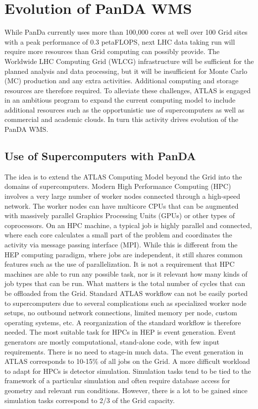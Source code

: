 \documentclass[10pt, conference, compsocconf]{IEEEtran}
\begin{document}
\section{Evolution of PanDA WMS}
While PanDa  currently uses  more than 100,000  cores at well over 100 Grid sites with a  peak performance  of 0.3 petaFLOPS,  next LHC data taking run will  require more resources  than Grid computing can possibly provide. The Worldwide LHC Computing Grid (WLCG) infrastructure will be sufficient for the planned analysis and data processing, but it will be insufficient  for Monte Carlo (MC) production and any extra activities. Additional computing and storage  resources are therefore required.  To alleviate  these challenges, ATLAS is engaged  in an ambitious  program to expand  the current computing model to include  additional  resources such as the opportunistic   use of supercomputers   as well as commercial and academic clouds. In turn this activity drives evolution of the PanDA WMS.

\subsection{Use of Supercomputers with PanDA}
The idea is to extend the ATLAS Computing Model beyond the Grid into the domains of supercomputers. Modern High Performance Computing  (HPC) involves  a very large number of worker nodes  connected  through a  high-speed   network. The worker nodes can have  multicore CPUs that can be augmented with massively parallel Graphics Processing Units (GPUs) or other types of coprocessors. On an HPC machine, a  typical job is highly parallel and connected,  where each core calculates  a small part of the problem and coordinates the activity via message passing interface (MPI). While this is different from the HEP computing paradigm, where jobs are independent, it still shares common  features  such as the use of parallelization. It is not a requirement  that HPC machines are able to run any possible task, nor is it relevant how many kinds of job types that can be run. What matters is the total number of cycles that can be offloaded from the Grid. Standard  ATLAS  workflow  can not be easily ported to supercomputers   due  to   several   complications such  as specialized worker  node  setups, no  outbound network connections,  limited memory per node, custom operating systems,  etc. A reorganization  of the standard  workflow is therefore needed.
The most suitable task for HPCs in HEP is event generation. Event generators are mostly computational,  stand-alone code, with few input requirements.  There is no need  to stage-in much data. The event generation  in ATLAS corresponds  to
10-15\% of all jobs on the Grid. A more difficult workload to adapt  for HPCs is detector  simulation. Simulation tasks tend to be tied to the framework of a particular simulation and often require  database access for geometry and relevant run conditions.  However,  there is a  lot to be gained  since simulation  tasks correspond to 2/3 of the Grid capacity.
\end{document}
